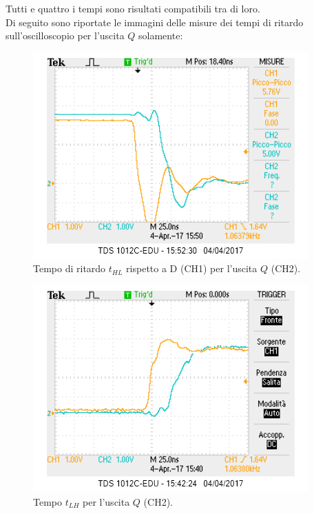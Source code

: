 \documentclass[10pt,a4paper]{article}
\begin{document}
Tutti e quattro i tempi sono risultati compatibili tra di loro.\\

Di seguito sono riportate le immagini delle misure dei tempi di ritardo sull'oscilloscopio per l'uscita $Q$ solamente:\\

\begin{figure}[!htb]
\centering
\includegraphics[scale=1.0]{tphlQ.png}
\caption{Tempo di ritardo  $t_{HL}$ rispetto a D (CH1) per l'uscita $Q$ (CH2).\label{q1}}
\end{figure}

\begin{figure}[!htb]
\centering
\includegraphics[scale=1.0]{tplhQ.png}
\caption{Tempo $t_{LH}$ per l'uscita $Q$ (CH2).\label{q2}}
\end{figure}
\end{document}
